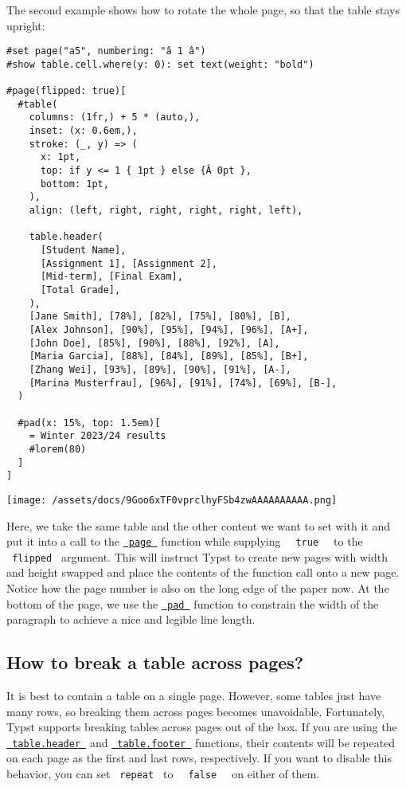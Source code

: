 The second example shows how to rotate the whole page, so that the table
stays upright:

\begin{verbatim}
#set page("a5", numbering: "â 1 â")
#show table.cell.where(y: 0): set text(weight: "bold")

#page(flipped: true)[
  #table(
    columns: (1fr,) + 5 * (auto,),
    inset: (x: 0.6em,),
    stroke: (_, y) => (
      x: 1pt,
      top: if y <= 1 { 1pt } else {Â 0pt },
      bottom: 1pt,
    ),
    align: (left, right, right, right, right, left),

    table.header(
      [Student Name],
      [Assignment 1], [Assignment 2],
      [Mid-term], [Final Exam],
      [Total Grade],
    ),
    [Jane Smith], [78%], [82%], [75%], [80%], [B],
    [Alex Johnson], [90%], [95%], [94%], [96%], [A+],
    [John Doe], [85%], [90%], [88%], [92%], [A],
    [Maria Garcia], [88%], [84%], [89%], [85%], [B+],
    [Zhang Wei], [93%], [89%], [90%], [91%], [A-],
    [Marina Musterfrau], [96%], [91%], [74%], [69%], [B-],
  )

  #pad(x: 15%, top: 1.5em)[
    = Winter 2023/24 results
    #lorem(80)
  ]
]
\end{verbatim}

\texttt{[image: /assets/docs/9Goo6xTF0vprclhyFSb4zwAAAAAAAAAA.png]}

Here, we take the same table and the other content we want to set with
it and put it into a call to the
\href{/docs/reference/layout/page/}{\texttt{\ page\ }} function while
supplying \texttt{\ }{\texttt{\ true\ }}\texttt{\ } to the
\texttt{\ flipped\ } argument. This will instruct Typst to create new
pages with width and height swapped and place the contents of the
function call onto a new page. Notice how the page number is also on the
long edge of the paper now. At the bottom of the page, we use the
\href{/docs/reference/layout/pad/}{\texttt{\ pad\ }} function to
constrain the width of the paragraph to achieve a nice and legible line
length.

\subsection{How to break a table across
pages?}\label{table-across-pages}

It is best to contain a table on a single page. However, some tables
just have many rows, so breaking them across pages becomes unavoidable.
Fortunately, Typst supports breaking tables across pages out of the box.
If you are using the
\href{/docs/reference/model/table/\#definitions-header}{\texttt{\ table.header\ }}
and
\href{/docs/reference/model/table/\#definitions-footer}{\texttt{\ table.footer\ }}
functions, their contents will be repeated on each page as the first and
last rows, respectively. If you want to disable this behavior, you can
set \texttt{\ repeat\ } to \texttt{\ }{\texttt{\ false\ }}\texttt{\ } on
either of them.

